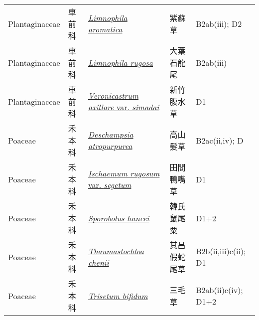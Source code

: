 {\begin{longtable}{L{2.5cm}L{2cm}L{5cm}L{2.5cm}L{3cm}}
    Plantaginaceae & 車前科 & \href{http://www.theplantlist.org/tpl1.1/search?q=Limnophila+aromatica}{\textit{Limnophila aromatica} } & 紫蘇草 & B2ab(iii); D2    \\
    Plantaginaceae & 車前科 & \href{http://www.theplantlist.org/tpl1.1/search?q=Limnophila+rugosa}{\textit{Limnophila rugosa} } & 大葉石龍尾 & B2ab(iii)    \\
    Plantaginaceae & 車前科 & \href{http://www.theplantlist.org/tpl1.1/search?q=Veronicastrum+axillare+var.+simadai}{\textit{Veronicastrum axillare} var. \textit{simadai} } & 新竹腹水草 & D1    \\
    Poaceae & 禾本科 & \href{http://www.theplantlist.org/tpl1.1/search?q=Deschampsia+atropurpurea}{\textit{Deschampsia atropurpurea} } & 高山髮草 & B2ac(ii,iv); D    \\
    Poaceae & 禾本科 & \href{http://www.theplantlist.org/tpl1.1/search?q=Ischaemum+rugosum+var.+segetum}{\textit{Ischaemum rugosum} var. \textit{segetum} } & 田間鴨嘴草 & D1    \\
    Poaceae & 禾本科 & \href{http://www.theplantlist.org/tpl1.1/search?q=Sporobolus+hancei}{\textit{Sporobolus hancei} } & 韓氏鼠尾粟 & D1+2    \\
    Poaceae & 禾本科 & \href{http://www.theplantlist.org/tpl1.1/search?q=Thaumastochloa+chenii}{\textit{Thaumastochloa chenii} } & 其昌假蛇尾草 & B2b(ii,iii)c(ii); D1    \\
    Poaceae & 禾本科 & \href{http://www.theplantlist.org/tpl1.1/search?q=Trisetum+bifidum}{\textit{Trisetum bifidum} } & 三毛草 & B2ab(ii)c(iv); D1+2    \\

\end{longtable}}
